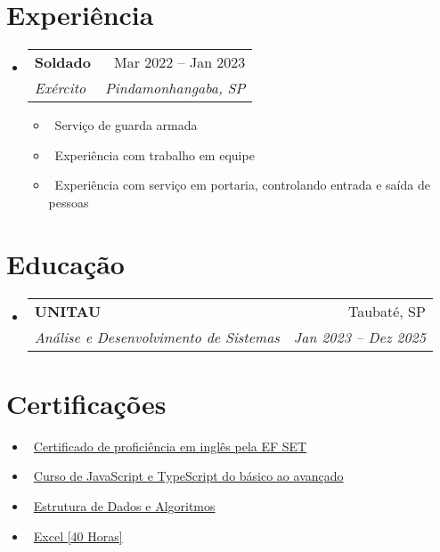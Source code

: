 \documentclass[letterpaper,10pt]{article}
\makeatletter
\newcommand{\resumeItem}[1]{\item\small{#1}}
\newcommand{\resumeSubheading}[4]{
\vspace{-1pt}\item
  \begin{tabular*}{0.97\textwidth}[t]{l@{\extracolsep{\fill}}r}
    \textbf{#1} & #2 \\
    \textit{#3} & \textit{#4} \\
  \end{tabular*}\vspace{-7pt}
}
\newcommand{\resumeSubHeadingList}{\begin{itemize}[leftmargin=0.15in, label={}]}
\newcommand{\resumeSubHeadingListEnd}{\end{itemize}}
\makeatother
\begin{document}
\section{Experiência}
\resumeSubHeadingList
  \resumeSubheading
      {Soldado}{Mar 2022 -- Jan 2023}
      {Exército}{Pindamonhangaba, SP}
      \resumeSubHeadingList
          \resumeItem{\textbullet\ Serviço de guarda armada}
          \resumeItem{\textbullet\ Experiência com trabalho em equipe}
          \resumeItem{\textbullet\ Experiência com serviço em portaria, controlando entrada e saída de pessoas}
      \resumeSubHeadingListEnd
\resumeSubHeadingListEnd

\section{Educação}
\resumeSubHeadingList
  \resumeSubheading
      {UNITAU}{Taubaté, SP}
      {Análise e Desenvolvimento de Sistemas} {Jan 2023 -- Dez 2025}
\resumeSubHeadingListEnd

\section{Certificações}
\resumeSubHeadingList
    \resumeItem{\textbullet\ \normalsize{\href{https://cert.efset.org/KdGLiQ}{Certificado de proficiência em inglês pela EF SET}}}
    \resumeItem{\textbullet\ \normalsize{\href{https://udemy-certificate.s3.amazonaws.com/image/UC-6fc7d4af-701d-446a-b69b-8e167018a749.jpg?v=1706800581000}{Curso de JavaScript e TypeScript do básico ao avançado}}}
    \resumeItem{\textbullet\ \normalsize{\href{https://udemy-certificate.s3.amazonaws.com/image/UC-7074fe91-0541-4bfd-bc58-af41912a6361.jpg?v=1703254492000}{Estrutura de Dados e Algoritmos}}}
    \resumeItem{\textbullet\ \normalsize{\href{https://www.cursoemvideo.com/validacao-de-certificado/?codigo=798CE-654D-9}{Excel [40 Horas]}}}
\resumeSubHeadingListEnd
\end{document}
